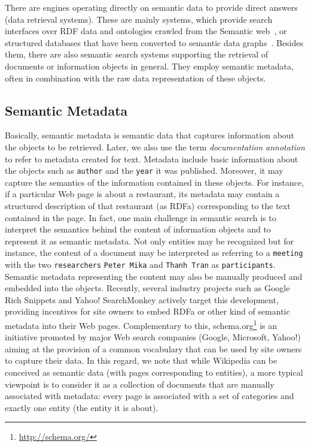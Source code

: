 There are engines operating directly on semantic data to provide direct answers (data retrieval systems). These are mainly systems, which provide search interfaces over RDF data and ontologies crawled from the Semantic web~\cite{DBLP:journals/ijswis/ChengQ09,DBLP:journals/ws/TranWH09,DBLP:journals/ws/HoganHUKPD11}, or structured databases that have been converted to semantic data graphs~\cite{DBLP:conf/sigmod/LiJLF09,DBLP:conf/sigmod/LiOFWZ08}. Besides them, there are also semantic search systems supporting the retrieval of documents or information objects in general. They employ semantic metadata, often in combination with the raw data representation of these objects. 
	
\subsection{Semantic Metadata}
Basically, semantic metadata is semantic data that captures information about the objects to be retrieved. Later, we also use the term \emph{documentation annotation} to refer to metadata created for text. Metadata include basic information about the objects such as \verb+author+ and the \verb+year+ it was published. Moreover, it may capture the semantics of the information contained in these objects. For instance, if a particular Web page is about a restaurant, its metadata may contain a structured description of that restaurant (as RDFa) corresponding to the text contained in the page. In fact, one main challenge in semantic search is to interpret the semantics behind the content of information objects and to represent it as semantic metadata. Not only entities may be recognized but for instance, the content of a document may be interpreted as referring to a \verb+meeting+ with the two \verb+researchers+ \verb+Peter Mika+ and \verb+Thanh Tran+ as \verb+participants+. Semantic metadata representing the content may also be manually produced and embedded into the objects. Recently, several industry projects such as Google Rich Snippets and Yahoo! SearchMonkey actively target this development, providing incentives for site owners to embed RDFa or other kind of semantic metadata into their Web pages. Complementary to this,  schema.org\footnote{\url{http://schema.org/}} is an initiative promoted by major Web search companies (Google, Microsoft, Yahoo!) aiming at the provision of a common vocabulary that can be used by site owners to capture their data. In this regard, we note that while Wikipedia can be conceived as semantic data (with pages corresponding to entities), a more typical viewpoint is to consider it as a collection of documents that are manually associated with metadata: every page is associated with a set of categories and exactly one entity (the entity it is about).  




